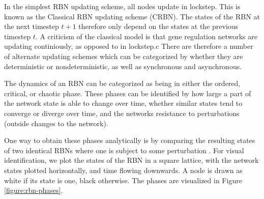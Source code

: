 In the simplest RBN updating scheme, all nodes update in lockstep.
This is known as the Classical RBN updating scheme (CRBN).
The states of the RBN at the next timestep $t+1$ therefore only depend on the states at the previous timestep $t$.
A criticism of the classical model is that gene regulation networks are updating continiously,
as opposed to in lockstep.c
There are therefore a number of alternate updating schemes which can be categorized by whether they are deterministic or nondeterministic, as well as synchronous and asynchronous.

The dynamics of an RBN can be categorized as being in either the ordered, critical, or chaotic phase.
These phases can be identified by how large a part of the network state is able to change over time,
whether similar states tend to converge or diverge over time,
and the networks resistance to perturbations (outside changes to the network).

One way to obtain these phases analytically is by comparing the resulting states of two identical RBNs where one is subject to some perturbation \cite{gershenson2004introduction}.
For visual identification, we plot the states of the RBN in a square lattice,
with the network states plotted horizontally, and time flowing downwards.
A node is drawn as white if its state is one, black otherwise.
The phases are visualized in Figure \ref{figure:rbn-phases}.

